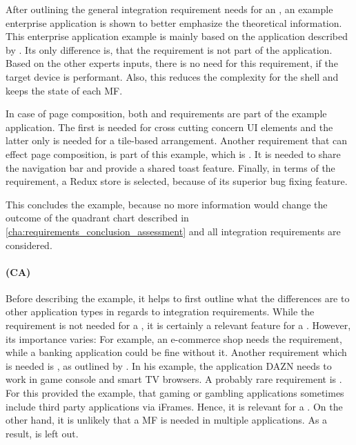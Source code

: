 After outlining the general integration requirement needs for an , an example enterprise application is shown to better emphasize the theoretical information.
This enterprise application example is mainly based on the application described by \textciteOlleck{}.
Its only difference is, that the  requirement is not part of the application.
Based on the other experts inputs, there is no need for this requirement, if the target device is performant.
Also, this reduces the complexity for the shell and keeps the state of each \ac{MF}.

In case of page composition, both  and  requirements are part of the example application.
The first is needed for cross cutting concern \ac{UI} elements and the latter only is needed for a tile-based arrangement.
Another requirement that can effect page composition, is part of this example, which is .
It is needed to share the navigation bar and provide a shared toast feature.
Finally, in terms of the  requirement, a Redux store is selected, because of its superior bug fixing feature.

This concludes the  example, because no more information would change the outcome of the quadrant chart described in \ref{cha:requirements_conclusion_assessment} and all integration requirements are considered.



\paragraph{ (CA)}\label{cha:evaluation_consumer}

Before describing the example, it helps to first outline what the differences are to other application types in regards to integration requirements.
While the  requirement is not needed for a , it is certainly a relevant feature for a .
However, its importance varies:
For example, an e-commerce shop needs the requirement, while a banking application could be fine without it.
Another requirement which is needed is , as outlined by \textciteMezzalira{}.
In his example, the application DAZN needs to work in game console and smart TV browsers.
A probably rare requirement is .
For this \textciteSteyer{} provided the example, that gaming or gambling applications sometimes include third party applications via iFrames.
Hence, it is relevant for a .
On the other hand, it is unlikely that a \ac{MF} is needed in multiple applications.
As a result,  is left out.

